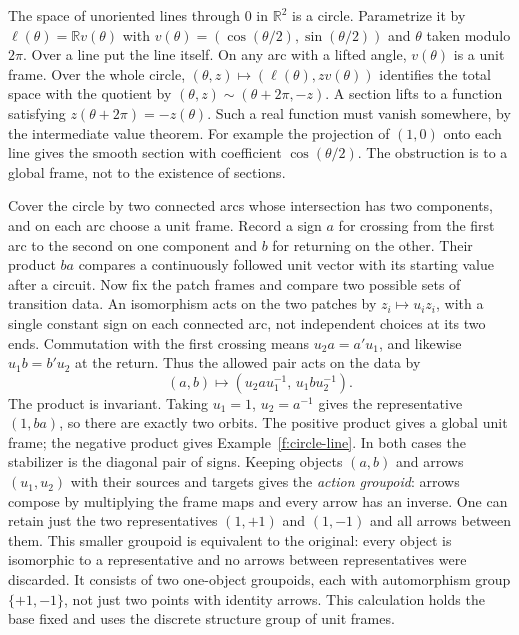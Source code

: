 \begin{example}\label{f:circle-line}
The space of unoriented lines through $0$ in $\mathbb R^2$ is a circle. Parametrize it by $\ell(\theta)=\mathbb R v(\theta)$ with $v(\theta)=(\cos(\theta/2),\sin(\theta/2))$ and $\theta$ taken modulo $2\pi$. Over a line put the line itself. On any arc with a lifted angle, $v(\theta)$ is a unit frame. Over the whole circle, $(\theta,z)\mapsto(\ell(\theta),z v(\theta))$ identifies the total space with the quotient by $(\theta,z)\sim(\theta+2\pi,-z)$. A section lifts to a function satisfying $z(\theta+2\pi)=-z(\theta)$. Such a real function must vanish somewhere, by the intermediate value theorem. For example the projection of $(1,0)$ onto each line gives the smooth section with coefficient $\cos(\theta/2)$. The obstruction is to a global frame, not to the existence of sections.
\end{example}

Cover the circle by two connected arcs whose intersection has two components, and on each arc choose a unit frame. Record a sign $a$ for crossing from the first arc to the second on one component and $b$ for returning on the other. Their product $ba$ compares a continuously followed unit vector with its starting value after a circuit. Now fix the patch frames and compare two possible sets of transition data. An isomorphism acts on the two patches by $z_i\mapsto u_i z_i$, with a single constant sign on each connected arc, not independent choices at its two ends. Commutation with the first crossing means $u_2a=a'u_1$, and likewise $u_1b=b'u_2$ at the return. Thus the allowed pair acts on the data by
\begin{equation}
 (a,b)\longmapsto (u_2 a u_1^{-1},\,u_1 b u_2^{-1}).\label{f:sign-groupoid}
\end{equation}
The product is invariant. Taking $u_1=1$, $u_2=a^{-1}$ gives the representative $(1,ba)$, so there are exactly two orbits. The positive product gives a global unit frame; the negative product gives Example~\ref{f:circle-line}. In both cases the stabilizer is the diagonal pair of signs. Keeping objects $(a,b)$ and arrows $(u_1,u_2)$ with their sources and targets gives the \emph{action groupoid}: arrows compose by multiplying the frame maps and every arrow has an inverse. One can retain just the two representatives $(1,+1)$ and $(1,-1)$ and all arrows between them. This smaller groupoid is equivalent to the original: every object is isomorphic to a representative and no arrows between representatives were discarded. It consists of two one-object groupoids, each with automorphism group $\{+1,-1\}$, not just two points with identity arrows. This calculation holds the base fixed and uses the discrete structure group of unit frames.

